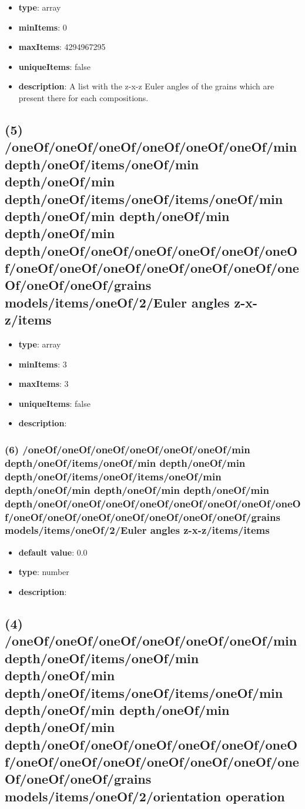 \begin{itemize}[leftmargin=4em]\item {\bf type}: array
\item {\bf minItems}: 0
\item {\bf maxItems}: 4294967295
\item {\bf uniqueItems}: false
\item {\bf description}: A list with the z-x-z Euler angles of the grains which are present there for each compositions.
\end{itemize}\subsection{(5) /oneOf/oneOf/oneOf/oneOf/oneOf/oneOf/min depth/oneOf/items/oneOf/min depth/oneOf/min depth/oneOf/items/oneOf/items/oneOf/min depth/oneOf/min depth/oneOf/min depth/oneOf/min depth/oneOf/oneOf/oneOf/oneOf/oneOf/oneOf/oneOf/oneOf/oneOf/oneOf/oneOf/oneOf/oneOf/oneOf/oneOf/grains models/items/oneOf/2/Euler angles z-x-z/items}
\begin{itemize}[leftmargin=5em]\item {\bf type}: array
\item {\bf minItems}: 3
\item {\bf maxItems}: 3
\item {\bf uniqueItems}: false
\item {\bf description}: 
\end{itemize}\subsubsection{(6) /oneOf/oneOf/oneOf/oneOf/oneOf/oneOf/min depth/oneOf/items/oneOf/min depth/oneOf/min depth/oneOf/items/oneOf/items/oneOf/min depth/oneOf/min depth/oneOf/min depth/oneOf/min depth/oneOf/oneOf/oneOf/oneOf/oneOf/oneOf/oneOf/oneOf/oneOf/oneOf/oneOf/oneOf/oneOf/oneOf/oneOf/grains models/items/oneOf/2/Euler angles z-x-z/items/items}
\begin{itemize}[leftmargin=6em]\item {\bf default value}: 0.0
\item {\bf type}: number
\item {\bf description}: 
\end{itemize}\subsection{(4) /oneOf/oneOf/oneOf/oneOf/oneOf/oneOf/min depth/oneOf/items/oneOf/min depth/oneOf/min depth/oneOf/items/oneOf/items/oneOf/min depth/oneOf/min depth/oneOf/min depth/oneOf/min depth/oneOf/oneOf/oneOf/oneOf/oneOf/oneOf/oneOf/oneOf/oneOf/oneOf/oneOf/oneOf/oneOf/oneOf/oneOf/grains models/items/oneOf/2/orientation operation}
